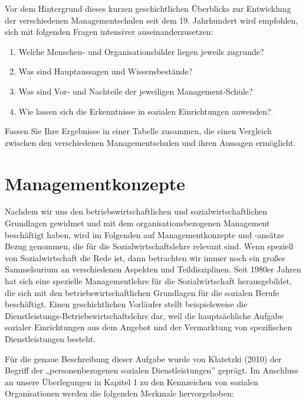 \documentclass[
  letterpaper,
]{book}
\begin{document}
Vor dem Hintergrund dieses kurzen geschichtlichen Überblicks zur
Entwicklung der verschiedenen Managementschulen seit dem 19. Jahrhundert
wird empfohlen, sich mit folgenden Fragen intensiver
auseinanderzusetzen:

\begin{enumerate}
\def\labelenumi{\arabic{enumi}.}
\item
  Welche Menschen‐ und Organisationsbilder liegen jeweils zugrunde?
\item
  Was sind Hauptaussagen und Wissensbestände?
\item
  Was sind Vor‐ und Nachteile der jeweiligen Management‐Schule?
\item
  Wie lassen sich die Erkenntnisse in sozialen Einrichtungen anwenden?
\end{enumerate}

Fassen Sie Ihre Ergebnisse in einer Tabelle zusammen, die einen
Vergleich zwischen den verschiedenen Managementschulen und ihren
Aussagen ermöglicht.

\chapter{Managementkonzepte}\label{managementkonzepte}

Nachdem wir uns den betriebswirtschaftlichen und sozialwirtschaftlichen
Grundlagen gewidmet und mit dem organisationsbezogenen Management
beschäftigt haben, wird im Folgenden auf Managementkonzepte und -ansätze
Bezug genommen, die für die Sozialwirtschaftslehre relevant sind. Wenn
speziell von Sozialwirtschaft die Rede ist, dann betrachten wir immer
noch ein großes Sammelsurium an verschiedenen Aspekten und
Teildisziplinen. Seit 1980er Jahren hat sich eine spezielle
Managementlehre für die Sozialwirtschaft herausgebildet, die sich mit
den betriebswirtschaftlichen Grundlagen für die sozialen Berufe
beschäftigt. Einen geschichtlichen Vorläufer stellt beispielsweise die
Dienstleistungs-Betriebswirtschaftslehre dar, weil die hauptsächliche
Aufgabe sozialer Einrichtungen aus dem Angebot und der Vermarktung von
spezifischen Dienstleistungen besteht.

Für die genaue Beschreibung dieser Aufgabe wurde von Klatetzki (2010)
der Begriff der „personenbezogenen sozialen Dienstleistungen'' geprägt.
Im Anschluss an unsere Überlegungen in Kapitel 1 zu den Kennzeichen von
sozialen Organisationen werden die folgenden Merkmale hervorgehoben:
\end{document}
